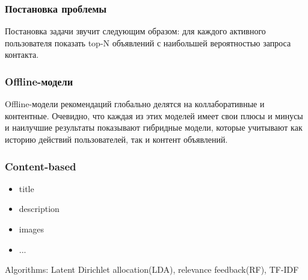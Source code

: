 \documentclass[14pt]{beamer}
\begin{document}
		\begin{frame}
			\frametitle{Постановка проблемы}
			Постановка задачи звучит следующим образом: для каждого активного пользователя показать top-N объявлений с наибольшей вероятностью запроса контакта.
				\begin{figure}[h]
					\begin{minipage}[h]{0.65\linewidth}
					\end{minipage}
					\hfill
					\begin{minipage}[h]{0.65\linewidth}
					\end{minipage}
				\end{figure}
		\end{frame}
		
		\begin{frame}
			\frametitle{Offline-модели}
			Offline-модели рекомендаций глобально делятся на коллаборативные и контентные. Очевидно, что каждая из этих моделей имеет свои плюсы и минусы и наилучшие результаты показывают гибридные модели, которые учитывают как историю действий пользователей, так и контент объявлений. 
		\end{frame}
		
		\begin{frame}
			\frametitle{Content-based}
			\begin{itemize}
				\item title
				\item description
				\item images
				\item ...
			\end{itemize}
			Algorithms: Latent Dirichlet allocation(LDA), relevance feedback(RF), TF-IDF  
		\end{frame}
		
\end{document}
